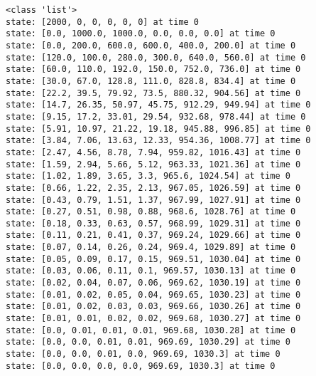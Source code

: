 \documentclass[11pt]{article}
\begin{document}
    \begin{Verbatim}[commandchars=\\\{\}]
<class 'list'>
state: [2000, 0, 0, 0, 0, 0] at time 0
state: [0.0, 1000.0, 1000.0, 0.0, 0.0, 0.0] at time 0
state: [0.0, 200.0, 600.0, 600.0, 400.0, 200.0] at time 0
state: [120.0, 100.0, 280.0, 300.0, 640.0, 560.0] at time 0
state: [60.0, 110.0, 192.0, 150.0, 752.0, 736.0] at time 0
state: [30.0, 67.0, 128.8, 111.0, 828.8, 834.4] at time 0
state: [22.2, 39.5, 79.92, 73.5, 880.32, 904.56] at time 0
state: [14.7, 26.35, 50.97, 45.75, 912.29, 949.94] at time 0
state: [9.15, 17.2, 33.01, 29.54, 932.68, 978.44] at time 0
state: [5.91, 10.97, 21.22, 19.18, 945.88, 996.85] at time 0
state: [3.84, 7.06, 13.63, 12.33, 954.36, 1008.77] at time 0
state: [2.47, 4.56, 8.78, 7.94, 959.82, 1016.43] at time 0
state: [1.59, 2.94, 5.66, 5.12, 963.33, 1021.36] at time 0
state: [1.02, 1.89, 3.65, 3.3, 965.6, 1024.54] at time 0
state: [0.66, 1.22, 2.35, 2.13, 967.05, 1026.59] at time 0
state: [0.43, 0.79, 1.51, 1.37, 967.99, 1027.91] at time 0
state: [0.27, 0.51, 0.98, 0.88, 968.6, 1028.76] at time 0
state: [0.18, 0.33, 0.63, 0.57, 968.99, 1029.31] at time 0
state: [0.11, 0.21, 0.41, 0.37, 969.24, 1029.66] at time 0
state: [0.07, 0.14, 0.26, 0.24, 969.4, 1029.89] at time 0
state: [0.05, 0.09, 0.17, 0.15, 969.51, 1030.04] at time 0
state: [0.03, 0.06, 0.11, 0.1, 969.57, 1030.13] at time 0
state: [0.02, 0.04, 0.07, 0.06, 969.62, 1030.19] at time 0
state: [0.01, 0.02, 0.05, 0.04, 969.65, 1030.23] at time 0
state: [0.01, 0.02, 0.03, 0.03, 969.66, 1030.26] at time 0
state: [0.01, 0.01, 0.02, 0.02, 969.68, 1030.27] at time 0
state: [0.0, 0.01, 0.01, 0.01, 969.68, 1030.28] at time 0
state: [0.0, 0.0, 0.01, 0.01, 969.69, 1030.29] at time 0
state: [0.0, 0.0, 0.01, 0.0, 969.69, 1030.3] at time 0
state: [0.0, 0.0, 0.0, 0.0, 969.69, 1030.3] at time 0
    \end{Verbatim}

    \begin{center}
    \end{center}
    { \hspace*{\fill} \\}
    
\end{document}
